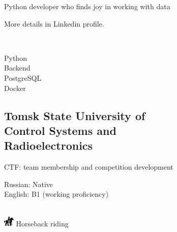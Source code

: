 \documentclass[a4paper]{MagicalCV}
\begin{document}
\lastupdated


\begin{minipage}[t]{0.33\textwidth} 


Python developer who finds joy in working with data

More details in Linkedin profile.
\sectionsep


\\


\sectionsep


\textbullet{}Python \\
\textbullet{}Backend \\
\textbullet{}PostgreSQL \\
\textbullet{}Docker \\


\subsection{Tomsk State University of \\ Control Systems and \\ Radioelectronics}
\vspace{\topsep} %
CTF: team membership and competition development
\sectionsep


\textbullet{}Russian: Native\\
\textbullet{}English: B1 (working proficiency)
\sectionsep

\\
\includegraphics[width=0.5cm]{horse_icon.png} Horseback riding
\sectionsep


\end{minipage} 
\end{document}
